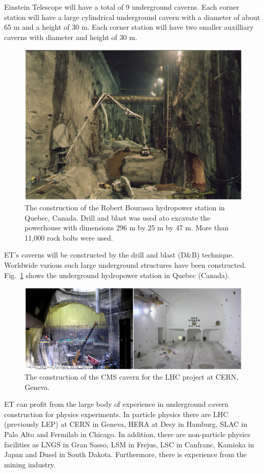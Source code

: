 Einstein Telescope will have a total of 9 underground caverns. Each corner station
will have a large cylindrical underground cavern with a diameter of about 65 m and a
height of 30 m. Each corner station will have two smaller auxilliary caverns
with diameter and height of 30 m.

\begin{figure}[htbp!]
\centering
\includegraphics[width=12cm]{./Sec_SiteInfra/Figures/station.jpg}
\caption{The construction of the Robert Bourassa hydropower station in Quebec, Canada. 
Drill and blast was used ato excavate the powerhouse with dimensions 296 m by
25 m by 47 m. More than 11,000 rock bolts were used.}
\label{fig:station}
\end{figure}
ET's caverns will be constructed by the drill and blast (D\&B) technique. 
Worldwide various such large underground
structures have been constructed. Fig.~\ref{fig:station} shows the underground
hydropower station in Quebec (Canada). 

\begin{figure}[htbp!]
\centering
\includegraphics[width=16cm]{./Sec_SiteInfra/Figures/lhc.jpg}
\caption{The construction of the CMS cavern for the LHC project at CERN, Geneva.}
\label{fig:lhc}
\end{figure}
ET can profit from the large body of experience in underground cavern construction
for physics experiments. In particle physics there are LHC (previously LEP) at
CERN in Geneva, HERA at Desy in Hamburg, SLAC in Palo Alto and Fermilab in Chicago.
In addition, there are non-particle physics facilities as LNGS in Gran Sasso, LSM in Frejus, 
LSC in Canfranc, Kamioka in Japan and Dusel in South Dakota. 
Furthermore, there is experience from the mining industry.

